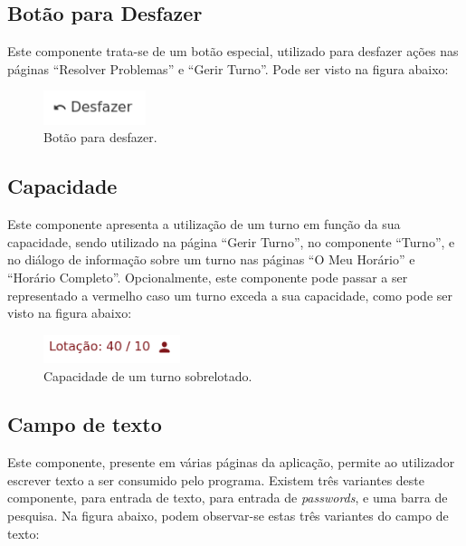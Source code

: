 \documentclass[12pt, a4paper]{article}
\begin{document}
\subsection{Botão para Desfazer}

Este componente trata-se de um botão especial, utilizado para desfazer ações nas páginas
``Resolver Problemas'' e ``Gerir Turno''. Pode ser visto na figura abaixo:

\begin{figure}[H]
    \centering
    \includegraphics[width=3cm]{res/components/undo-button.png}
    \caption{Botão para desfazer.}
    \label{undo-button}
\end{figure}

\subsection{Capacidade}

Este componente apresenta a utilização de um turno em função da sua capacidade, sendo utilizado na
página ``Gerir Turno'', no componente ``Turno'', e no diálogo de informação sobre um turno nas
páginas ``O Meu Horário'' e ``Horário Completo''. Opcionalmente, este componente pode passar a ser
representado a vermelho caso um turno exceda a sua capacidade, como pode ser visto na figura abaixo:

\begin{figure}[H]
    \centering
    \includegraphics[width=4cm]{res/components/capacity.png}
    \caption{Capacidade de um turno sobrelotado.}
    \label{capacity}
\end{figure}

\subsection{Campo de texto}

Este componente, presente em várias páginas da aplicação, permite ao utilizador escrever texto a ser
consumido pelo programa. Existem três variantes deste componente, para entrada de texto, para
entrada de \emph{passwords}, e uma barra de pesquisa. Na figura abaixo, podem observar-se estas três
variantes do campo de texto:
\end{document}
